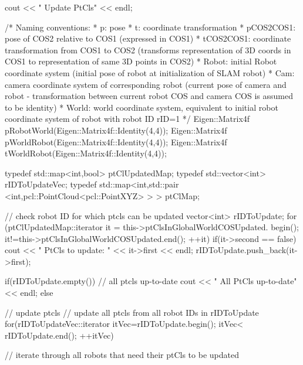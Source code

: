\begin{DoxyCode}
                                 {
        cout << "       Update PtCls" << endl;

        /* Naming conventions:
         * p: pose
         * t: coordinate transformation
         * pCOS2COS1:  pose of COS2 relative to COS1 (expressed in COS1)
         * tCOS2COS1:  coordinate transformation from COS1 to COS2 (transforms
       representation of 3D coords in COS1 to representation of same 3D points in COS2)
         * Robot: initial Robot coordinate system (initial pose of robot at
       initialization of SLAM robot)
         * Cam: camera coordinate system of corresponding robot (current pose
       of camera and robot - transformation between current robot COS and camera COS is
       assumed to be identity)
         * World: world coordinate system, equivalent to initial robot
       coordinate system of robot with robot ID rID=1
         */
        Eigen::Matrix4f pRobotWorld(Eigen::Matrix4f::Identity(4,4));
        Eigen::Matrix4f pWorldRobot(Eigen::Matrix4f::Identity(4,4));
        Eigen::Matrix4f tWorldRobot(Eigen::Matrix4f::Identity(4,4));

        typedef std::map<int,bool> ptClUpdatedMap;
        typedef std::vector<int> rIDToUpdateVec;
        typedef std::map<int,std::pair <int,pcl::PointCloud<pcl::PointXYZ> > > 
      ptClMap;

        // check robot ID for which ptcls can be updated
        vector<int> rIDToUpdate;
        for (ptClUpdatedMap::iterator it = this->ptClsInGlobalWorldCOSUpdated.
      begin(); it!=this->ptClsInGlobalWorldCOSUpdated.end(); ++it) {
                if(it->second == false) {
                        cout << "               PtCls to update: " << it->first
       << endl;
                        rIDToUpdate.push_back(it->first);
                }
        }

        if(rIDToUpdate.empty()) { // all ptcls up-to-date
                cout << "               All PtCls up-to-date" << endl;
        }
        else { // update ptcls
                // update all ptcls from all robot IDs in rIDToUpdate
                for(rIDToUpdateVec::iterator itVec=rIDToUpdate.begin(); itVec<
      rIDToUpdate.end(); ++itVec) {
                        // iterate through all robots that need their ptCls to
       be updated

}}}
\end{DoxyCode}
